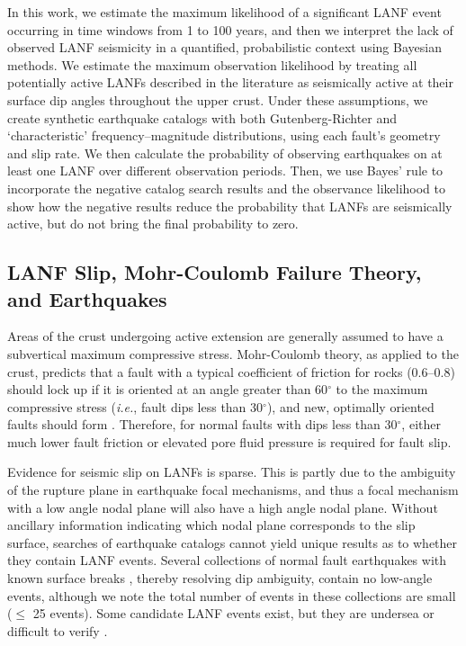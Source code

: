 \documentclass[twocolumn,grl]{AGUTeX}
\begin{document}
\begin{article}
In this work, we estimate the maximum likelihood of a significant LANF event
occurring in time windows from 1 to 100 years, and then we interpret the lack
of observed LANF seismicity in a quantified, probabilistic context using
Bayesian methods. We estimate the maximum observation likelihood by treating
all potentially active LANFs described in the literature as seismically active
at their surface dip angles throughout the upper crust. Under these
assumptions, we create synthetic earthquake catalogs with both
Gutenberg-Richter and `characteristic' frequency--magnitude distributions,
using each fault's geometry and slip rate.  We then calculate the probability
of observing earthquakes on at least one LANF over different observation
periods. Then, we use Bayes' rule to incorporate the negative catalog search
results and the observance likelihood to show how the negative results reduce
the probability that LANFs are seismically active, but do not bring the final
probability to zero.


\subsection{LANF Slip, Mohr-Coulomb Failure Theory, and Earthquakes}

Areas of the crust undergoing active extension are generally assumed to have
a subvertical maximum compressive stress.  Mohr-Coulomb theory, as applied to
the crust, predicts that a fault with a typical coefficient of friction for
rocks (0.6--0.8) should lock up if it is oriented at an angle greater than
60$^\circ$ to the maximum compressive stress  ({\it i.e.}, fault dips less than
30$^\circ$), and new, optimally oriented faults should form \citep{sibson1985}.
Therefore, for normal faults with dips less than 30$^\circ$, either much lower
fault friction or elevated pore fluid pressure is required for fault slip.

Evidence for seismic slip on LANFs is sparse.  This is partly due to the
ambiguity of the rupture plane in earthquake focal mechanisms, and thus a focal
mechanism with a low angle nodal plane will also have a high angle nodal plane.
Without ancillary information indicating which nodal plane corresponds to the
slip surface, searches of earthquake catalogs cannot yield unique results as to
whether they contain LANF events. Several collections of normal fault
earthquakes with known surface breaks \citep{jackson1987,
collettinisibson2001}, thereby resolving dip ambiguity, contain no low-angle
events, although we note the total number of events in these collections are
small ($\le$ 25 events).  Some candidate LANF events exist, but they are
undersea \citep[e.g.,][]{abers2001} or difficult to verify \citep[e.g.,]
[]{doser1987ancash}.



\end{article}
\end{document}
